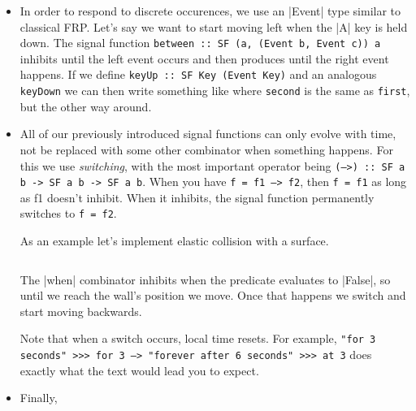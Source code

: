 \documentclass[pdftex,a4paper]{extarticle}
\begin{document}
\begin{itemize}
\item In order to respond to discrete occurences, we use an |Event| type similar to classical FRP. Let's say we want to start moving left when the |A| key is held down. The signal function \texttt{between :: SF (a, (Event b, Event c)) a} inhibits until the left event occurs and then produces until the right event happens. If we define \texttt{keyUp :: SF Key (Event Key)} and an analogous \texttt{keyDown} we can then write something like
where \texttt{second} is the same as \texttt{first}, but the other way around.
\begin{figure}[ht]
\centering
{}
\end{figure}
\item All of our previously introduced signal functions can only evolve with time, not be replaced with some other combinator when something happens. For this we use \emph{switching}, with the most important operator being \texttt{(-->) :: SF a b -> SF a b -> SF a b}.
When you have \texttt{f = f1 --> f2}, then \texttt{f = f1} as long as f1 doesn't inhibit. When it inhibits, the signal function permanently switches to \texttt{f = f2}.

As an example let's implement elastic collision with a surface.
\inputminted[breaklines=true]{haskell}{Switch.hs}
The |when| combinator inhibits when the predicate evaluates to |False|, so until we reach the wall's position we move. Once that happens we switch and start moving backwards.

Note that when a switch occurs, local time resets. For example, \texttt{"for 3 seconds" >>> for 3 --> "forever after 6 seconds" >>> at 3} does exactly what the text would lead you to expect.

\item Finally, 
\end{itemize}
\end{document}
